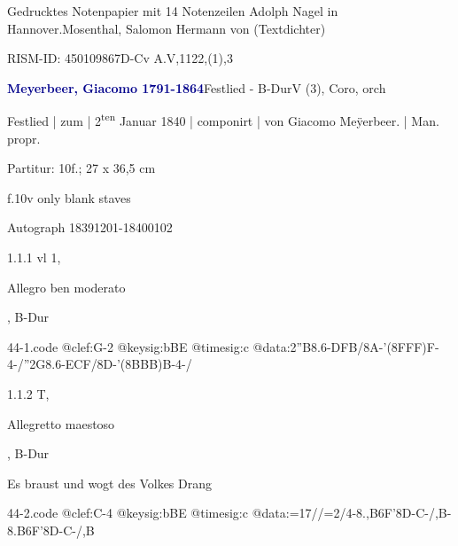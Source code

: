 \documentclass[a4paper, twocolumn, 11pt]{book}
\begin{document}
\newline %
\par Gedrucktes Notenpapier mit 14 Notenzeilen {\textquotedbl}Adolph Nagel in Hannover.{\textquotedbl}\newline Mosenthal, Salomon Hermann von  (Textdichter)
\par RISM-ID: 450109867\newline D-Cv  A.V,1122,(1),3
\par \vspace{16pt} \textcolor{darkblue}{\textbf{Meyerbeer, Giacomo  1791-1864}}\hfillplus{[44]}\newline Festlied - B-Dur\newline V (3), Coro, orch
\par \begin{itshape} Festlied | zum | 2\textsuperscript{t}\textsuperscript{e}\textsuperscript{n} Januar 1840 | componirt | von Giacomo Meÿerbeer. | Man. propr.\end{itshape} 
\par \textcolor{darkblue}{}  Partitur: 10f.; 27 x 36,5 cm\newline \begin{small} f.10v only blank staves\end{small} \newline Autograph  18391201-18400102
\par 1.1.1  vl 1, \begin{itshape}Allegro ben moderato\end{itshape}, B-Dur  
\begin{filecontents*}{44-1.code}
@clef:G-2
@keysig:bBE
@timesig:c
@data:2''B8.6-{DFB}/8A-'({8FFF})F-4-/''2G8.6-{ECF}/8D-'(8{BBB})B-4-/
\end{filecontents*}

\newline %
\par 1.1.2  T, \begin{itshape}Allegretto maestoso\end{itshape}, B-Dur\newline \begin{footnotesize} Es braust und wogt des Volkes Drang \end{footnotesize}  
\begin{filecontents*}{44-2.code}
@clef:C-4
@keysig:bBE
@timesig:c
@data:=17//=2/4-{8.,B6F}'8D-C-/,B-{8.B6F}'8D-C-/,B
\end{filecontents*}
\end{document}
